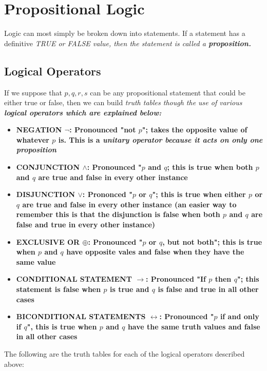 \section{Propositional Logic}

Logic can most simply be broken down into statements. If a statement has a definitive \it{TRUE} or \it{FALSE} value, then the statement is called a \bf{proposition}. \\


\subsection{Logical Operators}

If we suppose that $p,q,r,s$ can be any propositional statement that could be either true or false, then we can build \it{truth tables} though the use of various \bf{logical operators} which are explained below:

\begin{itemize}
    \item \bf{NEGATION $\neg$:} Pronounced "not $p$"; takes the opposite value of whatever $p$ is. This is a \it{unitary operator} because it acts on only one proposition
    \item \bf{CONJUNCTION $\wedge$:} Pronounced "$p$ and $q$; this is true when both $p$ and $q$ are true and false in every other instance
    \item \bf{DISJUNCTION $\vee$:} Prononced "$p$ or $q$"; this is true when either $p$ or $q$ are true and false in every other instance (an easier way to remember this is that the disjunction is false when both $p$ and $q$ are false and true in every other instance)
    \item \bf{EXCLUSIVE OR $\oplus$:} Pronounced "$p$ or $q$, but not both"; this is true when $p$ and $q$ have opposite vales and false when they have the same value
    \item \bf{CONDITIONAL STATEMENT $\rightarrow$:} Pronounced "If $p$ then $q$"; this statement is false when $p$ is true and $q$ is false and true in all other cases 
    \item \bf{BICONDITIONAL STATEMENTS $\leftrightarrow$:} Pronounced "$p$ if and only if $q$", this is true when $p$ and $q$ have the same truth values and false in all other cases
\end{itemize}

The following are the truth tables for each of the logical operators described above:\\



